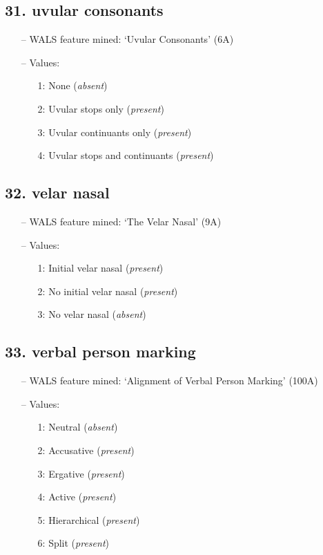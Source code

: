 \subsection*{31. uvular consonants}

\begin{itemize}
\item[--] WALS feature mined: `Uvular Consonants' (6A)
\item[--] Values:

\begin{enumerate}
\item[1:] None (\emph{absent})
\item[2:] Uvular stops only (\emph{present})
\item[3:] Uvular continuants only (\emph{present})
\item[4:] Uvular stops and continuants (\emph{present})
\end{enumerate}
\end{itemize}

\subsection*{32. velar nasal}

\begin{itemize}
\item[--] WALS feature mined: `The Velar Nasal' (9A)
\item[--] Values:

\begin{enumerate}
\item[1:] Initial velar nasal (\emph{present})
\item[2:] No initial velar nasal (\emph{present})
\item[3:] No velar nasal (\emph{absent})
\end{enumerate}
\end{itemize}

\subsection*{33. verbal person marking}

\begin{itemize}
\item[--] WALS feature mined: `Alignment of Verbal Person Marking' (100A)
\item[--] Values:

\begin{enumerate}
\item[1:] Neutral (\emph{absent})
\item[2:] Accusative (\emph{present})
\item[3:] Ergative (\emph{present})
\item[4:] Active (\emph{present})
\item[5:] Hierarchical (\emph{present})
\item[6:] Split (\emph{present})
\end{enumerate}
\end{itemize}

